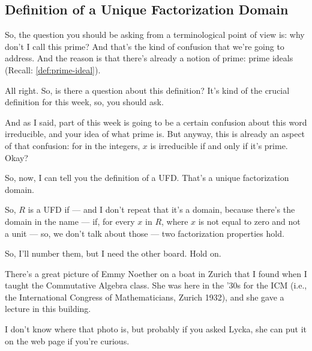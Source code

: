 \subsection{Definition of a Unique Factorization Domain}

\begin{speech}[00:11:05 - 00:12:10]
So, the question you should be asking from a terminological point of view is: why don't I call this prime? And that's the kind of confusion that we're going to address. And the reason is that there's already a notion of prime: prime ideals (Recall: \cref{def:prime-ideal}).

All right. So, is there a question about this definition? It's kind of the crucial definition for this week, so, you should ask.

And as I said, part of this week is going to be a certain confusion about this word irreducible, and your idea of what prime is. But anyway, this is already an aspect of that confusion: for in the integers, $x$ is irreducible if and only if it's prime. Okay?

So, now, I can tell you the definition  of a UFD. That's a unique factorization domain.

So, $R$ is a UFD  if --- and I don't repeat that it's a domain, because there's the domain in the name --- if, for every  $x$ in $R$, where $x$ is not equal to zero and not a unit --- so, we don't talk about those --- two factorization properties hold. 
\end{speech}

\begin{hidden}
\end{hidden}

\begin{speech}[00:12:10 - 00:13:40]
So, I'll number them, but I need the other board.  Hold on.

 There's a great picture of Emmy Noether on a boat in Zurich that I found when I taught the Commutative Algebra class. She was here in the '30s for the ICM (i.e., the International Congress of Mathematicians, Zurich 1932), and she gave a lecture in this building.

I don't know where that photo is, but probably if you asked Lycka, she can put it on the web page if you're curious. 
\end{speech}

